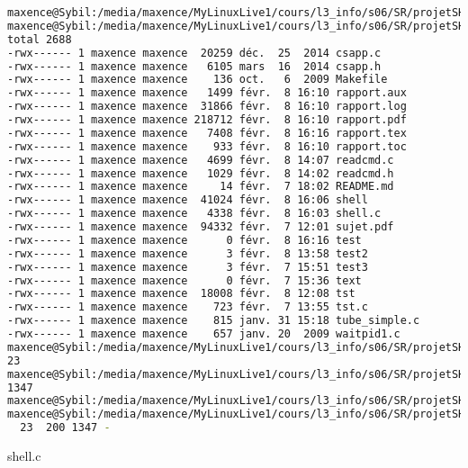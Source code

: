 \documentclass{report}
\begin{document}
			\begin{lstlisting}[frame=single,basicstyle=\footnotesize,language=bash]
maxence@Sybil:/media/maxence/MyLinuxLive1/cours/l3_info/s06/SR/projetSHELL$ ls -l > test
maxence@Sybil:/media/maxence/MyLinuxLive1/cours/l3_info/s06/SR/projetSHELL$ cat test
total 2688
-rwx------ 1 maxence maxence  20259 déc.  25  2014 csapp.c
-rwx------ 1 maxence maxence   6105 mars  16  2014 csapp.h
-rwx------ 1 maxence maxence    136 oct.   6  2009 Makefile
-rwx------ 1 maxence maxence   1499 févr.  8 16:10 rapport.aux
-rwx------ 1 maxence maxence  31866 févr.  8 16:10 rapport.log
-rwx------ 1 maxence maxence 218712 févr.  8 16:10 rapport.pdf
-rwx------ 1 maxence maxence   7408 févr.  8 16:16 rapport.tex
-rwx------ 1 maxence maxence    933 févr.  8 16:10 rapport.toc
-rwx------ 1 maxence maxence   4699 févr.  8 14:07 readcmd.c
-rwx------ 1 maxence maxence   1029 févr.  8 14:02 readcmd.h
-rwx------ 1 maxence maxence     14 févr.  7 18:02 README.md
-rwx------ 1 maxence maxence  41024 févr.  8 16:06 shell
-rwx------ 1 maxence maxence   4338 févr.  8 16:03 shell.c
-rwx------ 1 maxence maxence  94332 févr.  7 12:01 sujet.pdf
-rwx------ 1 maxence maxence      0 févr.  8 16:16 test
-rwx------ 1 maxence maxence      3 févr.  8 13:58 test2
-rwx------ 1 maxence maxence      3 févr.  7 15:51 test3
-rwx------ 1 maxence maxence      0 févr.  7 15:36 text
-rwx------ 1 maxence maxence  18008 févr.  8 12:08 tst
-rwx------ 1 maxence maxence    723 févr.  7 13:55 tst.c
-rwx------ 1 maxence maxence    815 janv. 31 15:18 tube_simple.c
-rwx------ 1 maxence maxence    657 janv. 20  2009 waitpid1.c
maxence@Sybil:/media/maxence/MyLinuxLive1/cours/l3_info/s06/SR/projetSHELL$ wc -l < test
23
maxence@Sybil:/media/maxence/MyLinuxLive1/cours/l3_info/s06/SR/projetSHELL$ wc -c < test
1347
maxence@Sybil:/media/maxence/MyLinuxLive1/cours/l3_info/s06/SR/projetSHELL$ wc - < test > test2
maxence@Sybil:/media/maxence/MyLinuxLive1/cours/l3_info/s06/SR/projetSHELL$ cat test2
  23  200 1347 -
		\end{lstlisting}
		shell.c
\end{document}

